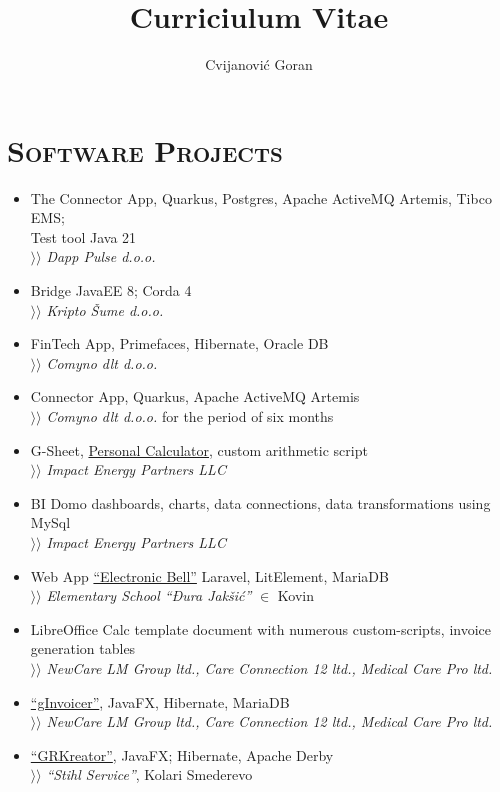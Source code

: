 \documentclass[12pt]{article}
\author{Cvijanović Goran}
\title{Curriciulum Vitae}
\begin{document}
\section{\textsc{Software Projects}}

\begin{itemize}[parsep=1.5pt]
    \item The Connector App, Quarkus, Postgres, Apache ActiveMQ Artemis, Tibco EMS; \\
    Test tool Java 21 \\
        $\rangle\!\rangle$ \textit{Dapp Pulse d.o.o.}
    \item Bridge JavaEE 8; Corda 4 \\
        $\rangle\!\rangle$ \textit{Kripto Šume d.o.o.}
    \item FinTech App, Primefaces, Hibernate, Oracle DB \\
        $\rangle\!\rangle$ \textit{Comyno dlt d.o.o.}
    \item Connector App, Quarkus, Apache ActiveMQ Artemis \\
        $\rangle\!\rangle$ \textit{Comyno dlt d.o.o.} for the period of six months
    \item G-Sheet, \href{https://docs.google.com/spreadsheets/d/1ztJoonmA0d0AyNDwVE1vnjpOPPpM03JF1eWCHwfQ4ZA/edit?usp=sharing}{Personal Calculator}, custom arithmetic script \\
        $\rangle\!\rangle$ \textit{Impact Energy Partners LLC}
    \item BI Domo dashboards, charts, data connections, data transformations using MySql \\
        $\rangle\!\rangle$ \textit{Impact Energy Partners LLC}
    \item Web App \href{https://zvono.nastavnikinformatike.com}{``Electronic Bell''} Laravel, LitElement, MariaDB \\
        $\rangle\!\rangle$ \textit{Elementary School ``Đura Jakšić''} $\in$ Kovin
    \item LibreOffice Calc template document with numerous custom-scripts, invoice generation tables \\ 
        $\rangle\!\rangle$ \textit{NewCare LM Group ltd., Care Connection 12 ltd., Medical Care Pro ltd.}
    \item \href{https://github.com/goranrsbg/gInvoicer}{``gInvoicer''}, JavaFX, Hibernate, MariaDB \\
        $\rangle\!\rangle$ \textit{NewCare LM Group ltd., Care Connection 12 ltd., Medical Care Pro ltd.}
    \item \href{https://github.com/goranrsbg/GRKreator}{``GRKreator''}, JavaFX; Hibernate, Apache Derby \\
        $\rangle\!\rangle$ \textit{``Stihl Service''}, Kolari Smederevo
\end{itemize}
\end{document}
